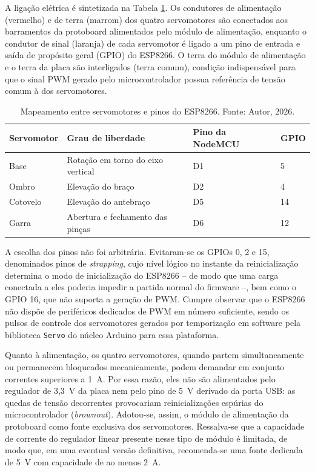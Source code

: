\documentclass[12pt]{article}
\begin{document}
A ligação elétrica é sintetizada na Tabela \ref{tab:pinos}. Os condutores de alimentação (vermelho) e de terra (marrom) dos quatro servomotores são conectados aos barramentos da protoboard alimentados pelo módulo de alimentação, enquanto o condutor de sinal (laranja) de cada servomotor é ligado a um pino de entrada e saída de propósito geral (GPIO) do ESP8266. O terra do módulo de alimentação e o terra da placa são interligados (terra comum), condição indispensável para que o sinal PWM gerado pelo microcontrolador possua referência de tensão comum à dos servomotores.

\begin{table}[htbp]
    \centering
    \small
    \caption{Mapeamento entre servomotores e pinos do ESP8266. Fonte: Autor, 2026.}
    \begin{tabular}{| l | l | l | l |}
        \hline
        \textbf{Servomotor} & \textbf{Grau de liberdade} & \textbf{Pino da NodeMCU} & \textbf{GPIO} \\ \hline
        Base & Rotação em torno do eixo vertical & D1 & 5 \\ \hline
        Ombro & Elevação do braço & D2 & 4 \\ \hline
        Cotovelo & Elevação do antebraço & D5 & 14 \\ \hline
        Garra & Abertura e fechamento das pinças & D6 & 12 \\ \hline
    \end{tabular}
    \label{tab:pinos}
\end{table}

A escolha dos pinos não foi arbitrária. Evitaram-se os GPIOs 0, 2 e 15, denominados pinos de \textit{strapping}, cujo nível lógico no instante da reinicialização determina o modo de inicialização do ESP8266 -- de modo que uma carga conectada a eles poderia impedir a partida normal do firmware --, bem como o GPIO 16, que não suporta a geração de PWM. Cumpre observar que o ESP8266 não dispõe de periféricos dedicados de PWM em número suficiente, sendo os pulsos de controle dos servomotores gerados por temporização em software pela biblioteca \texttt{Servo} do núcleo Arduino para essa plataforma.

Quanto à alimentação, os quatro servomotores, quando partem simultaneamente ou permanecem bloqueados mecanicamente, podem demandar em conjunto correntes superiores a 1~A. Por essa razão, eles não são alimentados pelo regulador de 3,3~V da placa nem pelo pino de 5~V derivado da porta USB: as quedas de tensão decorrentes provocariam reinicializações espúrias do microcontrolador (\textit{brownout}). Adotou-se, assim, o módulo de alimentação da protoboard como fonte exclusiva dos servomotores. Ressalva-se que a capacidade de corrente do regulador linear presente nesse tipo de módulo é limitada, de modo que, em uma eventual versão definitiva, recomenda-se uma fonte dedicada de 5~V com capacidade de ao menos 2~A.
\end{document}
